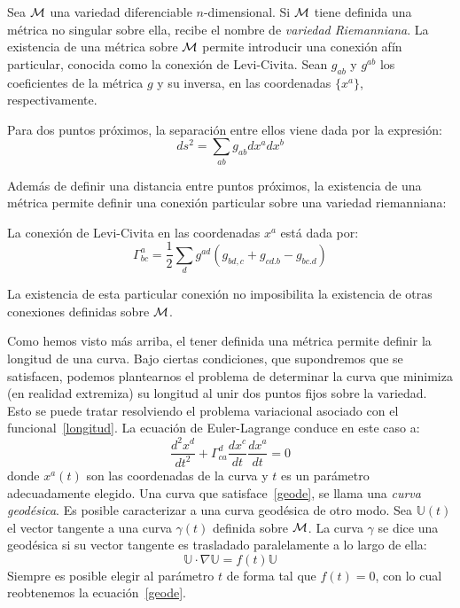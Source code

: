 {}
\label{s:WL:VariedadRiemmanniana}

Sea $\mathcal{M}$ una variedad diferenciable  $n$-dimensional. Si $\mathcal{M}$ tiene definida una
m\'etrica  no   singular  sobre  ella,   recibe  el  nombre  de   {\it  variedad
  Riemanniana}. La existencia de una m\'etrica sobre $\mathcal{M}$ permite introducir una
conexi\'on af\'in  particular, conocida como la conexi\'on  de Levi-Civita. Sean
$g_{ab}$ y  $g^{ab}$ los coeficientes de la  m\'etrica $g$ y su  inversa, en las
coordenadas $\{x^a\}$, respectivamente.

Para  dos puntos  pr\'oximos,  la separaci\'on  entre  ellos viene  dada por  la
expresi\'on:
%
\begin{equation}
ds^2 = \sum_{ab} g_{ab} dx^a dx^b \label{quad}
\end{equation}

Adem\'as de definir una distancia  entre puntos pr\'oximos, la existencia de una
m\'etrica  permite   definir  una  conexi\'on  particular   sobre  una  variedad
riemanniana:
%
\begin{definicion}
  La conexi\'on de Levi-Civita en las coordenadas $x^a$ est\'a dada por:
  \begin{equation}
  \Gamma^a_{bc} = \frac{1}{2} \sum_d g^{ad} \left(g_{bd,c} + g_{cd.b} - g_{bc.d} \right) \label{levi}
  \end{equation}
\end{definicion}

La existencia  de esta  particular conexi\'on no  imposibilita la  existencia de
otras conexiones definidas sobre $\mathcal{M}$.

Como hemos visto  m\'as arriba, el tener definida  una m\'etrica permite definir
la  longitud de  una curva.  Bajo ciertas  condiciones, que  supondremos  que se
satisfacen, podemos plantearnos el problema  de determinar la curva que minimiza
(en  realidad  extremiza)  su  longitud  al  unir  dos  puntos  fijos  sobre  la
variedad. Esto se puede tratar  resolviendo el problema variacional asociado con
el funcional~\eqref{longitud}. La ecuaci\'on de Euler-Lagrange  conduce en este
caso a:
%
\begin{equation}
\frac{d^2 x^d}{dt^2} + \Gamma^d_{ca} \frac{dx^c}{dt} \frac{dx^a}{dt} = 0 \label{geode}
\end{equation}
%
\noindent donde $x^a(t)$ son las coordenadas de la curva y $t$ es un par\'ametro
adecuadamente elegido. Una curva  que satisface~\eqref{geode}, se llama una {\it
  curva geod\'esica}.  Es posible caracterizar  a una curva geod\'esica  de otro
modo. Sea  $\mathbb{U}(t)$ el vector  tangente a una curva  $\gamma(t)$ definida
sobre $\mathcal{M}$.  La curva $\gamma$ se  dice una geod\'esica si su vector tangente es
trasladado paralelamente a lo largo de ella:
%
\[
\mathbb{U} \cdot \nabla \mathbb{U} = f(t) \mathbb{U}
\]
% 
Siempre es posible  elegir al par\'ametro $t$ de forma tal  que $f(t)=0$, con lo
cual reobtenemos la ecuaci\'on~\eqref{geode}.

